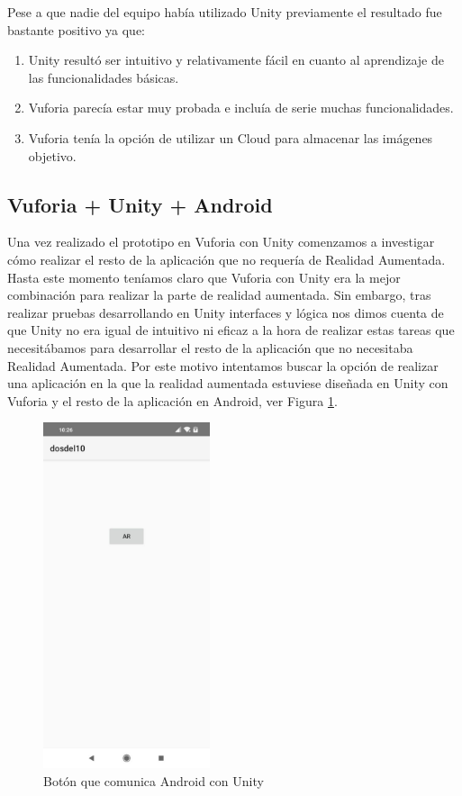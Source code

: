 Pese a que nadie del equipo había utilizado Unity previamente el resultado fue bastante positivo ya que:
\begin{enumerate}
    \item Unity resultó ser intuitivo y relativamente fácil en cuanto al aprendizaje de las funcionalidades básicas.
    \item Vuforia parecía estar muy probada e incluía de serie muchas funcionalidades.
    \item Vuforia tenía la opción de utilizar un Cloud para almacenar las imágenes objetivo.
\end{enumerate}


\subsection{Vuforia + Unity + Android} 
\label{makereference4.1.5}

Una vez realizado el prototipo en Vuforia con Unity comenzamos a investigar cómo realizar el resto de la aplicación que no requería de Realidad Aumentada.
Hasta este momento teníamos claro que Vuforia con Unity era la mejor combinación para realizar la parte de realidad aumentada. Sin embargo, tras realizar pruebas desarrollando en Unity interfaces y lógica nos dimos cuenta de que Unity no era igual de intuitivo ni eficaz a la hora de realizar estas tareas que necesitábamos para desarrollar el resto de la aplicación que no necesitaba Realidad Aumentada.
Por este motivo intentamos buscar la opción de realizar una aplicación en la que la realidad aumentada estuviese diseñada en Unity con Vuforia y el resto de la aplicación en Android, ver Figura \ref{fig:botonAndroidUnity}.

\begin{figure}[H]
    \centering
    \includegraphics[height=4in]{figures/androidUnityVuforia.jpg}
    \caption{Botón que comunica Android con Unity}
    \label{fig:botonAndroidUnity}
\end{figure}

